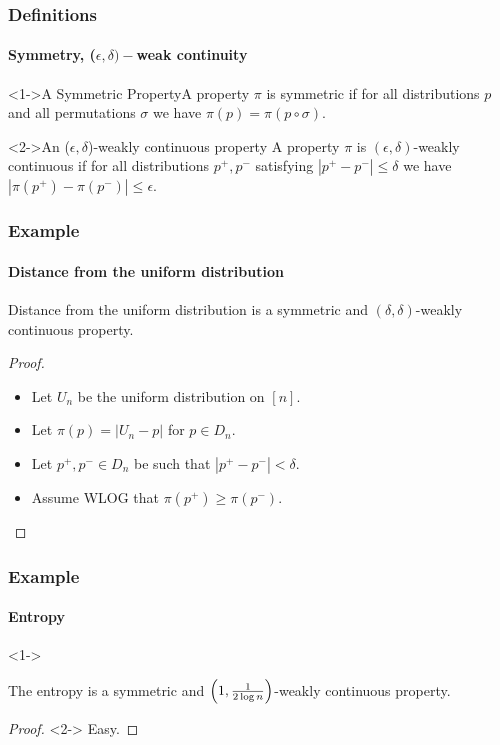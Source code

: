 \documentclass{beamer}
\begin{document}
\begin{frame}
  \frametitle{Definitions}
  \framesubtitle{Symmetry, ($\epsilon,\delta)-$weak continuity}

  \begin{block}<1->{A Symmetric Property}A property $\pi$ is symmetric if
    for all distributions $p$ and all permutations $\sigma$ we have
    $\pi(p)=\pi(p\circ\sigma)$.
  \end{block}

  \begin{block}<2->{An ($\epsilon, \delta$)-weakly continuous property}
    A property $\pi$ is $(\epsilon,\delta)$-weakly continuous if for
    all distributions $p^+,p^-$ satisfying $|p^+-p^-|\le\delta$ we
    have $|\pi(p^+)-\pi(p^-)|\le \epsilon$.
  \end{block}
\end{frame}

\begin{frame}
  \frametitle{Example} \framesubtitle{Distance from the uniform
    distribution}
  \begin{theorem}
    Distance from the uniform distribution is a symmetric and
    $(\delta, \delta)$-weakly continuous property.
  \end{theorem}
  \begin{proof}
    \begin{itemize}
    \item<1-> Let $U_n$ be the uniform distribution on $[n]$.
    \item<2-> Let $\pi(p)=|U_n-p|$ for $p\in D_n$.
    \item<3-> Let $p^+,p^-\in D_n$ be such that $|p^+-p^-|<\delta$.
    \item<4-> Assume WLOG that $\pi(p^+) \geq \pi(p^-)$.
    \end{itemize}
  \end{proof}
\end{frame}

\begin{frame}
  \frametitle{Example} \framesubtitle{Entropy}
  \begin{theorem}<1->

    The entropy is a symmetric and $\left(1,{1\over 2\log
        n}\right)$-weakly continuous property.
  \end{theorem}
  \begin{proof}<2->
    Easy.
  \end{proof}
\end{frame}
\end{document}

